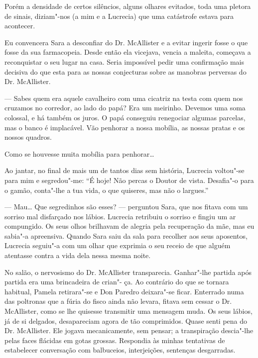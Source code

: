 Porém a densidade de certos silêncios, alguns olhares evitados, toda uma pletora de sinais, diziam"-nos (a mim e a Lucrecia) que
uma catástrofe estava para acontecer.



Eu convencera Sara a desconfiar do Dr. McAllister e a evitar ingerir
fosse o que fosse da sua farmacopeia. Desde então ela vicejava, vencia a
maleita, começava a reconquistar o seu lugar na casa. Seria impossível
pedir uma confirmação mais decisiva do que esta para as nossas
conjecturas sobre as manobras perversas do Dr. McAllister.

--- Sabes quem era aquele cavalheiro com uma cicatriz na testa com quem
  nos cruzamos no corredor, ao lado do papá? Era um meirinho. Devemos
  uma soma colossal, e há também os juros. O papá conseguiu renegociar
  algumas parcelas, mas o banco é implacável. Vão penhorar a nossa
  mobília, as nossas pratas e os nossos quadros.

Como se houvesse muita mobília para penhorar\ldots{}

Ao jantar, no final de mais um de tantos dias sem história, Lucrecia
voltou"-se para mim e segredou"-me: ``É hoje! Não percas o Doutor de
vista. Desafia"-o para o gamão, conta"-lhe a tua vida, o que quiseres, mas
não o largues.''

--- Mau\ldots{} Que segredinhos são esses? --- perguntou Sara, que nos fitava
  com um sorriso mal disfarçado nos lábios. Lucrecia retribuiu o
  sorriso e fingiu um ar compungido. Os seus olhos brilhavam de alegria
  pela recuperação da mãe, mas eu sabia"-a apreensiva. Quando Sara saiu
  da sala para recolher aos seus aposentos, Lucrecia seguiu"-a com um
  olhar que exprimia o seu receio de que alguém atentasse contra a vida
  dela nessa mesma noite.

No salão, o nervosismo do Dr. McAllister transparecia. Ganhar"-lhe
partida após partida era uma brincadeira de crian"- ça. Ao contrário do
que se tornara habitual, Pamela retirara"-se e Don Paredro deixara"-se
ficar. Enterrado numa das poltronas que a fúria do fisco ainda não
levara, fitava sem cessar o Dr. McAllister, como se lhe quisesse
transmitir uma mensagem
muda. Os seus lábios, já de si delgados, desapareciam agora de tão
comprimidos. Quase senti pena do Dr. McAllister. Ele jogava
mecanicamente, sem pensar; a transpiração descia"-lhe pelas faces
flácidas em gotas grossas. Respondia às minhas tentativas de estabelecer
conversação com balbuceios, interjeições, sentenças desgarradas.

